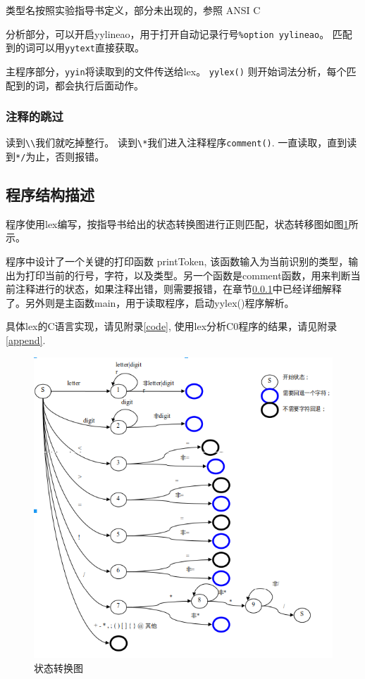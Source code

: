 \documentclass{article}
\begin{document}
\begin{CJK}{UTF8}{gkai}
类型名按照实验指导书定义，部分未出现的，参照 ANSI C \cite{ansic}

分析部分，可以开启yylineao，用于打开自动记录行号\verb|%option yylineao|。
匹配到的词可以用\verb|yytext|直接获取。

主程序部分，\verb|yyin|将读取到的文件传送给lex。 \verb|yylex()| 则开始词法分析，每个匹配到的词，都会执行后面动作。\cite{levine1992lex}\cite{lesk1975lex}
\subsubsection{注释的跳过}\label{sec:com}
读到\verb|\\|我们就吃掉整行。
读到\verb|\*|我们进入注释程序\verb|comment()|. 一直读取，直到读到\verb|*/|为止，否则报错。

\subsection{程序结构描述}
程序使用lex编写，按指导书给出的状态转换图进行正则匹配，状态转移图如图\ref{fig:state}所示。

程序中设计了一个关键的打印函数 printToken, 该函数输入为当前识别的类型，输出为打印当前的行号，字符，以及类型。另一个函数是comment函数，用来判断当前注释进行的状态，如果注释出错，则需要报错，在章节\ref{sec:com}中已经详细解释了。另外则是主函数main，用于读取程序，启动yylex()程序解析。

具体lex的C语言实现，请见附录\ref{code},
使用lex分析C0程序的结果，请见附录\ref{append}.
\begin{figure}[!h]
\includegraphics[width=\linewidth]{lex}
\caption{状态转换图}
\label{fig:state}
\end{figure}


\end{CJK}
\end{document}

